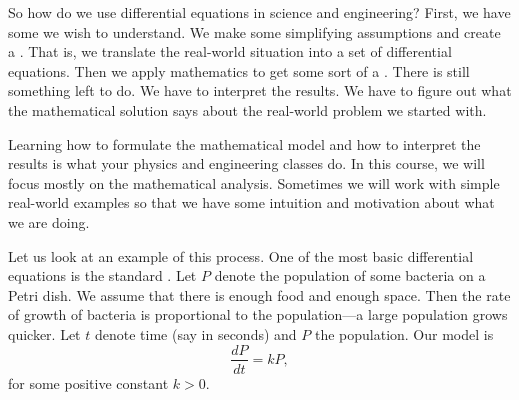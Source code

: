\begin{mywrapfigsimp}{3.05in}{3.35in}
\noindent
{}
\diffypdfversion{\par\vspace*{5pt}}
\end{mywrapfigsimp}
So how do we use differential equations in science and engineering?  
First, we have some \emph{} we wish
to understand.
We make some simplifying assumptions and create a
\emph{}.
That is, we translate the real-world situation into a
set of differential equations.
Then we apply mathematics to get some sort of a
\emph{}.
There is still something left to do.  We have to interpret the results.
We have to figure out what the mathematical solution says about the real-world
problem we started with.

Learning how to formulate the mathematical model and how to interpret the
results is what your physics and engineering classes do.  In this
course, we will focus mostly on the mathematical analysis.  Sometimes we will
work with simple real-world examples so that we have some intuition and
motivation about what we are doing.

Let us look at 
an example of this process.
One of the most basic differential equations
is the standard \emph{}.
Let $P$ denote the population 
of some bacteria on a Petri dish.  We assume that there is enough food
and enough space.  Then the rate of growth of bacteria is proportional
to the population---a large population grows quicker.  Let $t$ denote
time (say in seconds) and $P$ the population.  Our model
is
\begin{equation*}
\frac{dP}{dt} = kP ,
\end{equation*}
for some positive constant $k > 0$.

